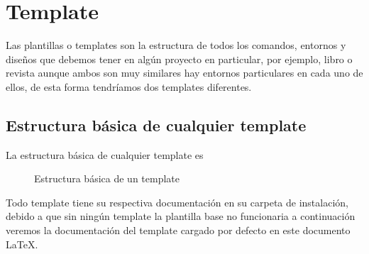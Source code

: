 {\justifying
	\chapter{Template}\label{cap:Template}
	Las plantillas o templates son la estructura de todos los comandos, entornos y diseños que debemos tener en algún proyecto en particular, por ejemplo, libro o revista aunque ambos son muy similares hay entornos particulares en cada uno de ellos, de esta forma tendríamos dos templates diferentes.
	\section{Estructura básica de cualquier template}
	La estructura básica de cualquier template es 
	\begin{figure}[H]
		\caption{Estructura básica de un template}
		\label{fig:EstructuraTemplate}
	\end{figure}
	Todo template tiene su respectiva documentación en su carpeta de instalación, debido a que sin ningún template la plantilla base no funcionaria a continuación veremos la documentación del template cargado por defecto en este documento \LaTeX.
}